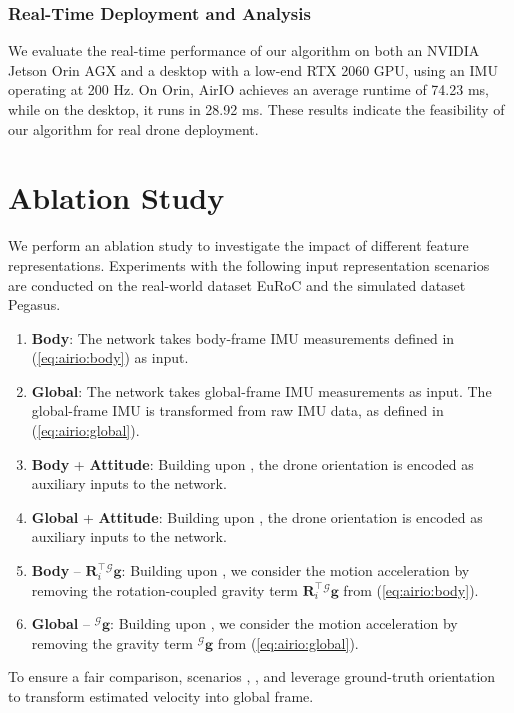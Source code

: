

\subsubsection{Real-Time Deployment and Analysis}
We evaluate the real-time performance of our algorithm on both an NVIDIA Jetson Orin AGX and a desktop with a low-end RTX 2060 GPU, using an IMU operating at 200 Hz. On Orin, AirIO achieves an average runtime of 74.23 ms, while on the desktop, it runs in 28.92 ms. These results indicate the feasibility of our algorithm for real drone deployment.


\section{Ablation Study}
\label{sec:airio:ablation}
We perform an ablation study to investigate the impact of different feature representations. Experiments with the following input representation scenarios are conducted on the real-world dataset EuRoC and the simulated dataset Pegasus.
\begin{enumerate}
\renewcommand{\labelenumi}{\roman{enumi}.}
\renewcommand{\theenumi}{\roman{enumi}}
    \item \textbf{Body}: The network takes body-frame IMU measurements defined in (\ref{eq:airio:body}) as input.\label{airio:abla:body}
    \item \textbf{Global}: The network takes global-frame IMU measurements as input. The global-frame IMU is transformed from raw IMU data, as defined in (\ref{eq:airio:global}). \label{airio:abla:global}
    \item \textbf{Body} + \textbf{Attitude}: Building upon , the drone orientation is encoded as auxiliary inputs to the network. \label{airio:abla:bwattitude}
    \item \textbf{Global} + \textbf{Attitude}: Building upon , the drone orientation is encoded as auxiliary inputs to the network.\label{airio:abla:gwattitude}
    \item \textbf{Body} -- $\mathbf{R}^\top_i {}^\mathcal{G}\mathbf{g}$:
    Building upon , we consider the motion acceleration by removing the rotation-coupled gravity term $\mathbf{R}^\top_i {}^\mathcal{G}\mathbf{g}$ from (\ref{eq:airio:body}).\label{airio:abla:bwog}
    \item \textbf{Global} -- ${}^\mathcal{G}\mathbf{g}$: Building upon , we consider the motion acceleration by removing the gravity term ${}^\mathcal{G}\mathbf{g}$ from (\ref{eq:airio:global}).\label{airio:abla:gwog}
\end{enumerate}
To ensure a fair comparison, scenarios , , and  leverage ground-truth orientation to transform estimated velocity into global frame.

